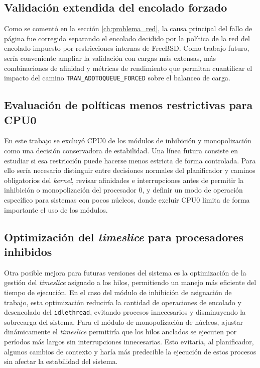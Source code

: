 \subsection{Validación extendida del encolado forzado}
Como se comentó en la sección \ref{ch:problema_red}, la causa principal del fallo de página fue corregida separando el encolado decidido por la política de la red del encolado impuesto por restricciones internas de FreeBSD. Como trabajo futuro, sería conveniente ampliar la validación con cargas más extensas, más combinaciones de afinidad y métricas de rendimiento que permitan cuantificar el impacto del camino \verb|TRAN_ADDTOQUEUE_FORCED| sobre el balanceo de carga.\par

\subsection{Evaluación de políticas menos restrictivas para CPU0}
En este trabajo se excluyó CPU0 de los módulos de inhibición y monopolización como una decisión conservadora de estabilidad. Una línea futura consiste en estudiar si esa restricción puede hacerse menos estricta de forma controlada. Para ello sería necesario distinguir entre decisiones normales del planificador y caminos obligatorios del \textit{kernel}, revisar afinidades e interrupciones antes de permitir la inhibición o monopolización del procesador 0, y definir un modo de operación específico para sistemas con pocos núcleos, donde excluir CPU0 limita de forma importante el uso de los módulos.\par

\subsection{Optimización del \textit{timeslice} para procesadores inhibidos}
Otra posible mejora para futuras versiones del sistema es la optimización de la gestión del \textit{timeslice} asignado a los hilos, permitiendo un manejo más eficiente del tiempo de ejecución. En el caso del módulo de inhibición de asignación de trabajo, esta optimización reduciría la cantidad de operaciones de encolado y desencolado del \texttt{idlethread}, evitando procesos innecesarios y disminuyendo la sobrecarga del sistema. Para el módulo de monopolización de núcleos, ajustar dinámicamente el \textit{timeslice} permitiría que los hilos anclados se ejecuten por períodos más largos sin interrupciones innecesarias. Esto evitaría, al planificador, algunos cambios de contexto y haría más predecible la ejecución de estos procesos sin afectar la estabilidad del sistema.\par

